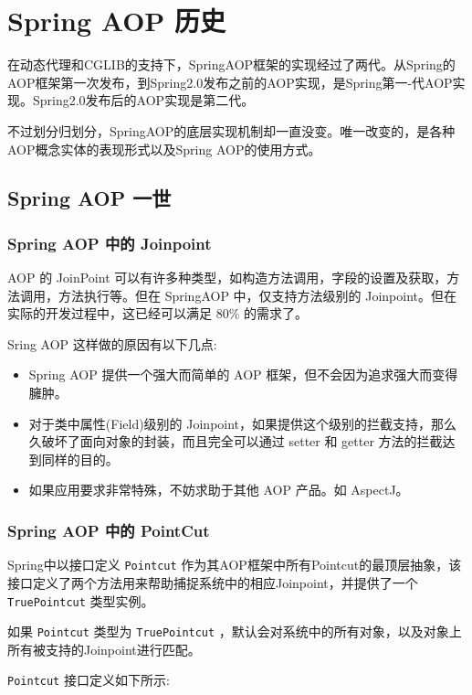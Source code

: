 \section{Spring AOP 历史}

在动态代理和CGLIB的支持下，SpringAOP框架的实现经过了两代。从Spring的AOP框架第一次发布，到Spring2.0发布之前的AOP实现，是Spring第一-代AOP实现。Spring2.0发布后的AOP实现是第二代。

不过划分归划分，SpringAOP的底层实现机制却一直没变。唯一改变的，是各种AOP概念实体的表现形式以及Spring AOP的使用方式。

\subsection{Spring AOP 一世}

\subsubsection{Spring AOP 中的 Joinpoint}

AOP 的 JoinPoint 可以有许多种类型，如构造方法调用，字段的设置及获取，方法调用，方法执行等。但在 SpringAOP 中，仅支持方法级别的 Joinpoint。但在实际的开发过程中，这已经可以满足 80\% 的需求了。

Sring AOP 这样做的原因有以下几点:
\begin{itemize}
    \item Spring AOP 提供一个强大而简单的 AOP 框架，但不会因为追求强大而变得臃肿。
    \item 对于类中属性(Field)级别的 Joinpoint，如果提供这个级别的拦截支持，那么久破坏了面向对象的封装，而且完全可以通过 setter 和 getter 方法的拦截达到同样的目的。
    \item 如果应用要求非常特殊，不妨求助于其他 AOP 产品。如 AspectJ。
\end{itemize}

\subsubsection{Spring AOP 中的 PointCut}

Spring中以接口定义 \texttt{Pointcut} 作为其AOP框架中所有Pointcut的最顶层抽象，该接口定义了两个方法用来帮助捕捉系统中的相应Joinpoint，并提供了一个 \texttt{TruePointcut} 类型实例。

如果 \texttt{Pointcut} 类型为 \texttt{TruePointcut} ，默认会对系统中的所有对象，以及对象上所有被支持的Joinpoint进行匹配。

\texttt{Pointcut} 接口定义如下所示:

